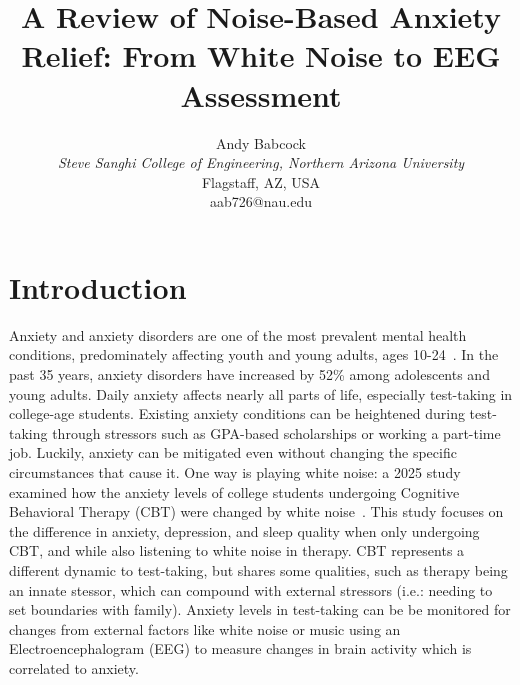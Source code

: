 \documentclass[journal]{IEEEtran}
\begin{document}
\title{A Review of Noise-Based Anxiety Relief: From White Noise to EEG Assessment}

\author{Andy Babcock \\
    \textit{Steve Sanghi College of Engineering, Northern Arizona University} \\
    Flagstaff, AZ, USA \\
    aab726@nau.edu
}

\maketitle

\section{Introduction}
Anxiety and anxiety disorders are one of the most prevalent mental health conditions, predominately affecting youth and young adults, ages 10-24~\cite{BieFengsai2024Rgbo}. In the past 35 years, anxiety disorders have increased by 52\% among adolescents and young adults. Daily anxiety affects nearly all parts of life, especially test-taking in college-age students. Existing anxiety conditions can be heightened during test-taking through stressors such as GPA-based scholarships or working a part-time job. Luckily, anxiety can be mitigated even without changing the specific circumstances that cause it. One way is playing white noise: a 2025 study examined how the anxiety levels of college students undergoing Cognitive Behavioral Therapy (CBT) were changed by white noise~\cite{LiLi2025EoWN}. This study focuses on the difference in anxiety, depression, and sleep quality when only undergoing CBT, and while also listening to white noise in therapy. CBT represents a different dynamic to test-taking, but shares some qualities, such as therapy being an innate stessor, which can compound with external stressors (i.e.: needing to set boundaries with family). Anxiety levels in test-taking can be be monitored for changes from external factors like white noise or music using an Electroencephalogram (EEG) to measure changes in brain activity which is correlated to anxiety.
\end{document}
